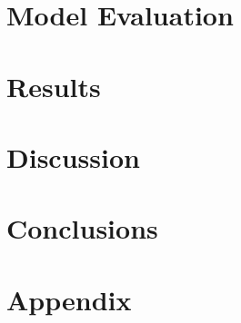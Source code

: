 \documentclass[draft,linenumbers]{agujournal2018}
\begin{document}
\noindent

\section{Model Evaluation}
\label{section:Model_Evaluation}

\section{Results}
\label{Results}

\section{Discussion}
\label{Discussion}

\section{Conclusions}

\clearpage

\section{Appendix}
\end{document}
